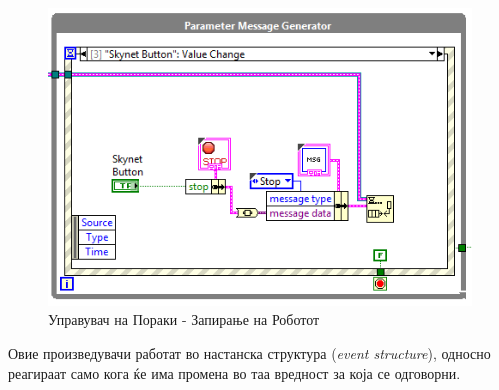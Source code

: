 \documentclass[12pt]{article}
\begin{document}
        \begin{figure}[!h]
          \centering
          \includegraphics[width=0.75\linewidth]{./images/robot_stop_generator.PNG}
          \caption{Управувач на Пораки - Запирање на Роботот}
        \end{figure}
      Овие произведувачи работат во настанска структура (\textit{event structure}), односно реагираат само кога ќе има промена во таа вредност за која се одговорни.
\end{document}
